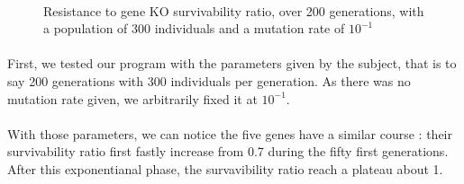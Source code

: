 \documentclass[]{report} %
\begin{document}
    \paragraph*{}
    \begin{figure}[h!] 
      \centering
      \caption{Resistance to gene KO survivability ratio, over 200 generations, with a population of 300 individuals and a mutation rate of $10^{-1}$}
      \label{fig:200x300x1}
    \end{figure}
    \paragraph*{}
    First, we tested our program with the parameters given by the subject, that is to say 200 generations with 300 individuals per generation. As there was no mutation rate given, we arbitrarily fixed it at $10^{-1}$.
    \paragraph*{}
     With those parameters, we can notice the five genes have a similar course : their survivability ratio first fastly increase from 0.7 during the fifty first generations. After this exponentianal phase, the survavibility ratio reach a plateau about 1.



    \subsection*{}
\end{document}
